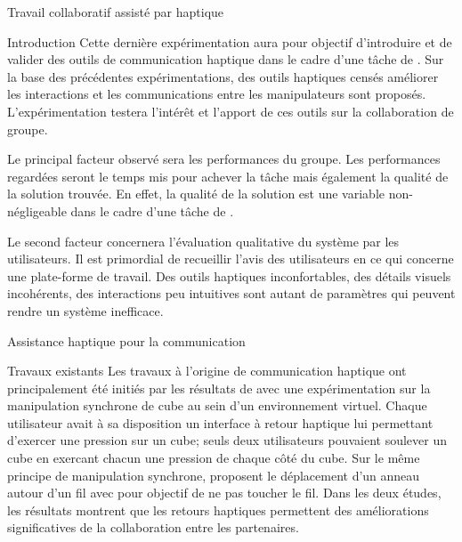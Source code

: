 \documentclass[myfrancais,ngerman,english,frenchb]{mythesis}
\begin{document}
	\begin{mychapter}{Travail collaboratif assisté par haptique}
		\begin{mysection}{Introduction}
			Cette dernière expérimentation aura pour objectif d'introduire et de valider des outils de communication haptique dans le cadre d'une tâche de .
			Sur la base des précédentes expérimentations, des outils haptiques censés améliorer les interactions et les communications entre les manipulateurs sont proposés.
			L'expérimentation testera l'intérêt et l'apport de ces outils sur la collaboration de groupe.

			Le principal facteur observé sera les performances du groupe.
			Les performances regardées seront le temps mis pour achever la tâche mais également la qualité de la solution trouvée.
			En effet, la qualité de la solution est une variable non-négligeable dans le cadre d'une tâche de .

			Le second facteur concernera l'évaluation qualitative du système par les utilisateurs.
			Il est primordial de recueillir l'avis des utilisateurs en ce qui concerne une plate-forme de travail.
			Des outils haptiques inconfortables, des détails visuels incohérents, des interactions peu intuitives sont autant de paramètres qui peuvent rendre un système inefficace.
		\end{mysection}
		\begin{mysection}{Assistance haptique pour la communication}
			\begin{mysubsection}{Travaux existants}
				Les travaux à l'origine de communication haptique ont principalement été initiés par les résultats de  avec une expérimentation sur la manipulation synchrone de cube au sein d'un environnement virtuel.
				Chaque utilisateur avait à sa disposition un interface à retour haptique lui permettant d'exercer une pression sur un cube; seuls deux utilisateurs pouvaient soulever un cube en exercant chacun une pression de chaque côté du cube.
				Sur le même principe de manipulation synchrone,  proposent le déplacement d'un anneau autour d'un fil avec pour objectif de ne pas toucher le fil.
				Dans les deux études, les résultats montrent que les retours haptiques permettent des améliorations significatives de la collaboration entre les partenaires.


\end{mysubsection}
\end{mysection}
\end{mychapter}
\end{document}

